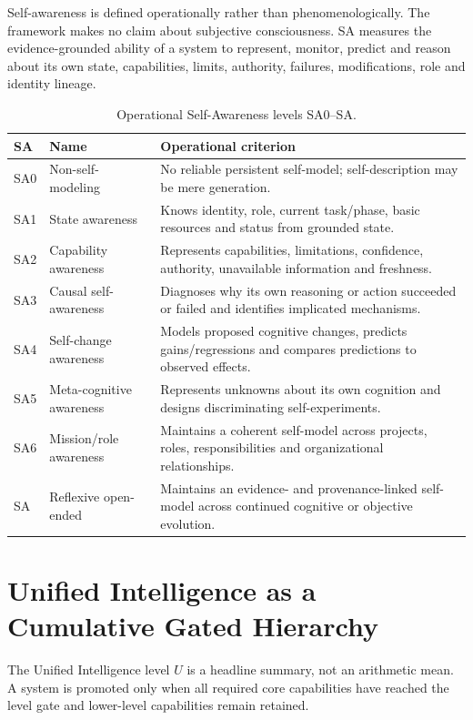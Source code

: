 Self-awareness is defined operationally rather than phenomenologically. The framework makes no claim about subjective consciousness. SA measures the evidence-grounded ability of a system to represent, monitor, predict and reason about its own state, capabilities, limits, authority, failures, modifications, role and identity lineage.

\begin{table}[!htbp]
\centering\small
\begin{tabularx}{\textwidth}{@{}llY@{}}
\toprule
SA & Name & Operational criterion \\
\midrule
SA0 & Non-self-modeling & No reliable persistent self-model; self-description may be mere generation. \\
SA1 & State awareness & Knows identity, role, current task/phase, basic resources and status from grounded state. \\
SA2 & Capability awareness & Represents capabilities, limitations, confidence, authority, unavailable information and freshness. \\
SA3 & Causal self-awareness & Diagnoses why its own reasoning or action succeeded or failed and identifies implicated mechanisms. \\
SA4 & Self-change awareness & Models proposed cognitive changes, predicts gains/regressions and compares predictions to observed effects. \\
SA5 & Meta-cognitive awareness & Represents unknowns about its own cognition and designs discriminating self-experiments. \\
SA6 & Mission/role awareness & Maintains a coherent self-model across projects, roles, responsibilities and organizational relationships. \\
SA\Om{} & Reflexive open-ended & Maintains an evidence- and provenance-linked self-model across continued cognitive or objective evolution. \\
\bottomrule
\end{tabularx}
\caption{Operational Self-Awareness levels SA0--SA\Om{}.}
\label{tab:sa}
\end{table}

\section{Unified Intelligence as a Cumulative Gated Hierarchy}

The Unified Intelligence level $U$ is a headline summary, not an arithmetic mean. A system is promoted only when all required core capabilities have reached the level gate and lower-level capabilities remain retained.

